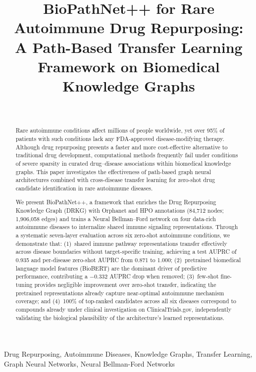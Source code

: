 \documentclass[conference]{IEEEtran}
\title{\LARGE \bf
BioPathNet++ for Rare Autoimmune Drug Repurposing:\\
A Path-Based Transfer Learning Framework on Biomedical Knowledge Graphs
}
\author{
\IEEEauthorblockN{TVNS Yatin, A Charan KR, Praveen Kumar Yadav, Srijan Jha}
\IEEEauthorblockA{PES University, Bengaluru, India\\
Email: \{tvnsyatin, acharankr, praveenyadav, srijanjha\}@pesu.pes.edu}
\\
\IEEEauthorblockA{Under the guidance of Dr.\ Priyanka H.}
}
\begin{document}
\maketitle

\begin{abstract}
Rare autoimmune conditions affect millions of people worldwide, yet over 95\% of patients with such conditions lack any FDA-approved disease-modifying therapy. Although drug repurposing presents a faster and more cost-effective alternative to traditional drug development, computational methods frequently fail under conditions of severe sparsity in curated drug--disease associations within biomedical knowledge graphs. This paper investigates the effectiveness of path-based graph neural architectures combined with cross-disease transfer learning for zero-shot drug candidate identification in rare autoimmune diseases.

We present BioPathNet++, a framework that enriches the Drug Repurposing Knowledge Graph (DRKG) with Orphanet and HPO annotations (84,712 nodes; 1,906,058 edges) and trains a Neural Bellman--Ford network on four data-rich autoimmune diseases to internalize shared immune signaling representations. Through a systematic seven-layer evaluation across six zero-shot autoimmune conditions, we demonstrate that: (1)~shared immune pathway representations transfer effectively across disease boundaries without target-specific training, achieving a test AUPRC of 0.935 and per-disease zero-shot AUPRC from 0.871 to 1.000; (2)~pretrained biomedical language model features (BioBERT) are the dominant driver of predictive performance, contributing a $-$0.332 AUPRC drop when removed; (3)~few-shot fine-tuning provides negligible improvement over zero-shot transfer, indicating the pretrained representations already capture near-optimal autoimmune mechanism coverage; and (4)~100\% of top-ranked candidates across all six diseases correspond to compounds already under clinical investigation on ClinicalTrials.gov, independently validating the biological plausibility of the architecture's learned representations.
\end{abstract}

\begin{IEEEkeywords}
Drug Repurposing, Autoimmune Diseases, Knowledge Graphs, Transfer Learning, Graph Neural Networks, Neural Bellman-Ford Networks
\end{IEEEkeywords}
\end{document}
